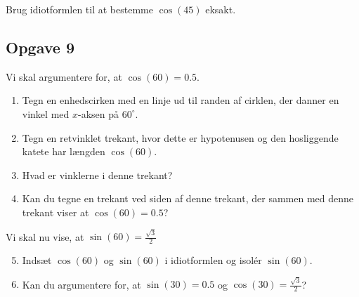 Brug idiotformlen til at bestemme $\cos(45)$ eksakt.

\subsection*{Opgave 9}
Vi skal argumentere for, at $\cos(60) = 0.5$. 
\begin{enumerate}[label=\roman*)]
	\item Tegn en enhedscirken med en linje ud til randen af cirklen,
	 der danner en vinkel med $x$-aksen på $60^\circ$.
	\item Tegn en retvinklet trekant, hvor dette er hypotenusen og
	 den hosliggende katete har længden $\cos(60)$.
	\item Hvad er vinklerne i denne trekant?
	\item Kan du tegne en trekant ved siden af denne trekant, der sammen med denne trekant
	 viser at $\cos(60) = 0.5$?
\end{enumerate}
Vi skal nu vise, at $\sin(60) = \frac{\sqrt{3}}{2}$
\begin{enumerate}[label=\roman*)]
	\setcounter{enumi}{4}
\item Indsæt $\cos(60)$ og $\sin(60)$ i idiotformlen og isolér $\sin(60)$. 
\item Kan du argumentere for, at $\sin(30) = 0.5$ og $\cos(30) = \frac{\sqrt{3}}{2}$?
\end{enumerate}

